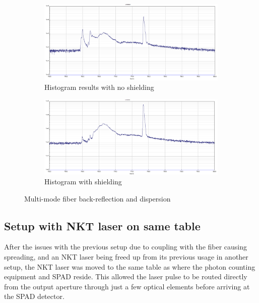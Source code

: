 \documentclass[a4paper]{article}
\begin{document}
\begin{figure}[!htb]
     \centering
     \begin{subfigure}[b]{1.0\textwidth}
         \centering
         \includegraphics[width=\textwidth]{550_no_hand.PNG}
         \caption{Histogram results with no shielding}
         \label{fig:fiber_graph_no_hand}
     \end{subfigure}
     \hfill
     \begin{subfigure}[b]{1.0\textwidth}
         \centering
         \includegraphics[width=\textwidth]{550-actually covered.PNG}
         \caption{Histogram with shielding}
         \label{fig:fiber_graph_hand}
     \end{subfigure}
        \caption{Multi-mode fiber  back-reflection and dispersion}
        \label{fig:fiber_graphs}
\end{figure}

\subsection{Setup with NKT laser on same table}

After the issues with the previous setup due to coupling with the fiber causing spreading, and an NKT laser being freed up from its previous usage in another setup, the NKT laser was moved to the same table as where the photon counting equipment and SPAD reside. This allowed the laser pulse to be routed directly from the output aperture through just a few optical elements before arriving at the SPAD detector.
\end{document}
